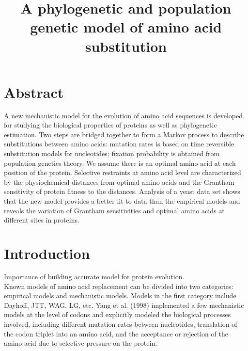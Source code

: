 \documentclass[13pt]{article}
\title{A phylogenetic and population genetic model of amino acid substitution}
\author{}
\begin{document}
\maketitle
\section{Abstract}
A new mechanistic model for the evolution of amino acid sequences is developed for studying the biological properties of proteins as well as phylogenetic estimation.  Two steps are bridged together to form a Markov process to describe substitutions between amino acids: mutation rates is based on time reversible substitution models for nucleotides; fixation probability is obtained from population genetics theory. We assume there is an optimal amino acid at each position of the protein. Selective restraints at amino acid level are characterized by the physiochemical distances from optimal amino acids and the Grantham sensitivity of protein fitness to the distances. Analysis of a yeast data set shows that the new model provides a better fit to data than the empirical models and reveals the variation of Grantham sensitivities and optimal amino acids at different sites in proteins.\\

\section{Introduction}
Importance of building accurate model for protein evolution. \\

Known models of amino acid replacement can be divided into two categories: empirical models and mechanistic models. Models in the first category include Dayhoff, JTT, WAG, LG, etc. Yang et al. (1998) implemented a few mechanistic models at the level of codons and explicitly modeled the biological processes involved, including different mutation rates between nucleotides, translation of the codon triplet into an amino acid, and the acceptance or rejection of the amino acid due to selective pressure on the protein. \\
\end{document}
